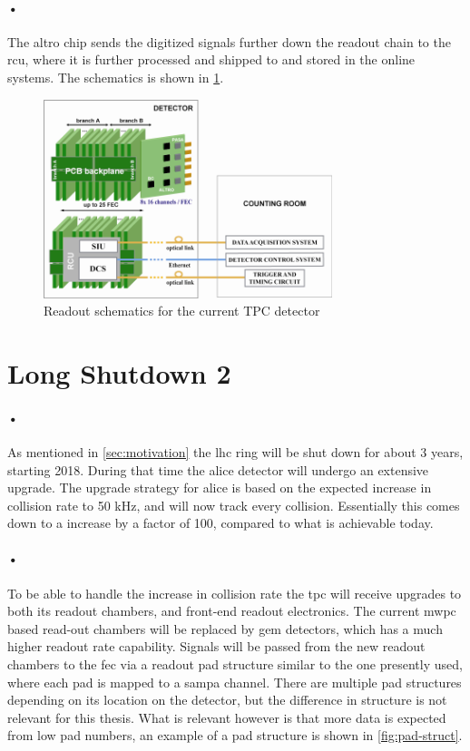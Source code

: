 \documentclass[a4paper, 12pt]{report}
\begin{document}
\paragraph{•}
The \gls{altro} chip sends the digitized signals further down the readout chain to the \gls{rcu}, where it is further processed and shipped to  and stored in the online systems.
The schematics is shown in \ref{fig:altro}.

\begin{figure}[h!]
  \centering
    \includegraphics[width=0.75\textwidth]{images/altro.png}
     \caption{Readout schematics for the current TPC detector \cite{tdr-016}}
    \label{fig:altro}
\end{figure}

\section{Long Shutdown 2}
\paragraph{•}
As mentioned in \ref{sec:motivation} the \gls{lhc} ring will be shut down for about 3 years, starting 2018.
During that time the \gls{alice} detector will undergo an extensive upgrade.
The upgrade strategy for \gls{alice} is based on the expected increase in collision rate to 50 kHz, and will now track every collision.
Essentially this comes down to a increase by a factor of 100, compared to what is achievable today.

\paragraph{•} 
To be able to handle the increase in collision rate the \gls{tpc} will receive upgrades to both its readout chambers, and front-end readout electronics.
The current \gls{mwpc} based read-out chambers will be replaced by \gls{gem} detectors, which has a much higher readout rate capability.
Signals will be passed from the new readout chambers to the \gls{fec} via a readout pad structure similar to the one presently used, where each pad is mapped to a \gls{sampa} channel.
There are multiple pad structures depending on its location on the detector, but the difference in structure is not relevant for this thesis.
What is relevant however is that more data is expected from low pad numbers, an example of a pad structure is shown in \ref{fig:pad-struct}.
\end{document}
